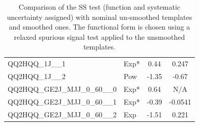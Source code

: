 \begin{table}[!h]
{\begin{tabular}{llcc}
			QQ2HQQ\_1J\_\_1                                             & Exp* &0.44&0.247\\
			QQ2HQQ\_1J\_\_2                                             & Pow &-1.35&-0.67\\
			QQ2HQQ\_GE2J\_MJJ\_0\_60\_\_0                               & Exp* &0.64&N/A\\
			QQ2HQQ\_GE2J\_MJJ\_0\_60\_\_1                               & Exp* &-0.39&-0.0541\\
			QQ2HQQ\_GE2J\_MJJ\_0\_60\_\_2                               & Exp &-1.51&0.221\\
			\hline\hline
		\end{tabular}
	}
	\caption{
		Comparison of the SS test (function and systematic uncertainty assigned) with nominal un-smoothed templates and smoothed ones. The functional form is chosen using a relaxed spurious signal test applied to the unsmoothed templates.
		\label{tab:comp_smooth_unsmooth1} }
\end{table}



